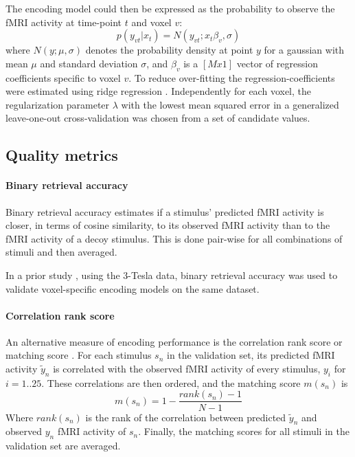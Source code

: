 The encoding model could then be expressed as the probability to observe the f{MRI} activity at time-point $t$ and voxel $v$:
\begin{equation}\label{eq:encmo} p(y_{vt}|x_{t}) = N(y_{vt};x_{t}\beta_{v},\sigma) \end{equation} where
$N(y;\mu,\sigma)$ denotes the probability density at point $y$ for a gaussian
with mean $\mu$ and standard deviation $\sigma$, and $\beta_{v}$ is a $[Mx1]$
vector of regression coefficients specific to voxel $v$. To reduce over-fitting
the regression-coefficients were estimated using ridge regression \cite{HK70}.
Independently for each voxel, the regularization parameter $\lambda$ with the
lowest mean squared error in a generalized leave-one-out cross-validation
\cite{GHW79} was chosen from a set of candidate values.

\subsection*{Quality metrics} 

\paragraph{Binary retrieval accuracy}

Binary retrieval accuracy \cite{ML08} estimates if a stimulus'
predicted f{MRI} activity is closer, in terms of cosine similarity, to its
observed f{MRI} activity than to the f{MRI} activity of a decoy stimulus.
This is done pair-wise for all combinations of stimuli and
then averaged.

In a prior study \cite{CTK+2012}, using the 3-Tesla data, binary retrieval accuracy was used to validate voxel-specific encoding models on the same dataset.

\paragraph{Correlation rank score}
An alternative measure of encoding performance is the correlation rank score or
matching score \cite{SF14}. For each stimulus $s_{n}$ in the validation set,
its predicted f{MRI} activity $\widetilde{y}_{n}$ is correlated with the
observed f{MRI} activity of every stimulus, $y_{i}$ for $i=1..25$. These
correlations are then ordered, and the  matching score $m(s_{n})$ is
\[ m(s_{n}) = 1-\frac{rank(s_{n})-1}{N-1} \]
Where $rank(s_{n})$ is the rank of the correlation between predicted $\widetilde{y}_{n}$
and observed $y_{n}$ f{MRI} activity of $s_{n}$. Finally, the matching scores for all
stimuli in the validation set are averaged.

